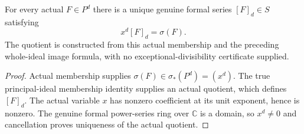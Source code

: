 \begin{lemma}
\label{hir:actual-formal-blowup-normalized-member}
For every actual $F\in P^d$ there is a unique genuine formal series
$[F]_d\in S$ satisfying
\[
 x^d[F]_d=\sigma(F).
\]
The quotient is constructed from this actual membership and the preceding
whole-ideal image formula, with no exceptional-divisibility certificate supplied.
\leanok
\end{lemma}
\begin{proof}
Actual membership supplies $\sigma(F)\in\sigma_*(P^d)=(x^d)$.
The true principal-ideal membership identity supplies an actual quotient,
which defines $[F]_d$. The actual variable $x$ has nonzero coefficient
at its unit exponent, hence is nonzero. The genuine formal power-series
ring over $\mathbb C$ is a domain, so $x^d\ne0$ and cancellation proves
uniqueness of the actual quotient.
\end{proof}

